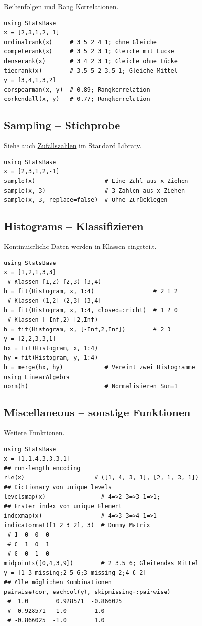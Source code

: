 \documentclass[10pt,twocolumn]{scrartcl}
\begin{document}
Reihenfolgen und Rang Korrelationen.

\begin{lstlisting}
using StatsBase
x = [2,3,1,2,-1]
ordinalrank(x)     # 3 5 2 4 1; ohne Gleiche
competerank(x)     # 3 5 2 3 1; Gleiche mit Lücke
denserank(x)       # 3 4 2 3 1; Gleiche ohne Lücke
tiedrank(x)        # 3.5 5 2 3.5 1; Gleiche Mittel
y = [3,4,1,3,2]
corspearman(x, y)  # 0.89; Rangkorrelation
corkendall(x, y)   # 0.77; Rangkorrelation
\end{lstlisting}

\subsection{Sampling -- Stichprobe}
\label{ssec:StatsBase_Sampling}

Siehe auch \hyperref[ssec:standardLibrary_Random]{Zufallszahlen} im Standard
Library.

\begin{lstlisting}
using StatsBase
x = [2,3,1,2,-1]
sample(x)                    # Eine Zahl aus x Ziehen
sample(x, 3)                 # 3 Zahlen aus x Ziehen
sample(x, 3, replace=false)  # Ohne Zurücklegen
\end{lstlisting}

\subsection{Histograms -- Klassifizieren}

Kontinuierliche Daten werden in Klassen eingeteilt.

\begin{lstlisting}
using StatsBase
x = [1,2,1,3,3]
 # Klassen [1,2) [2,3) [3,4)
h = fit(Histogram, x, 1:4)                 # 2 1 2
 # Klassen (1,2] (2,3] (3,4]
h = fit(Histogram, x, 1:4, closed=:right)  # 1 2 0
 # Klassen [-Inf,2) [2,Inf)
h = fit(Histogram, x, [-Inf,2,Inf])        # 2 3
y = [2,2,3,3,1]
hx = fit(Histogram, x, 1:4)
hy = fit(Histogram, y, 1:4)
h = merge(hx, hy)            # Vereint zwei Histogramme
using LinearAlgebra
norm(h)                      # Normalisieren Sum=1
\end{lstlisting}

\subsection{Miscellaneous -- sonstige Funktionen}

Weitere Funktionen.

\begin{lstlisting}
using StatsBase
x = [1,1,4,3,3,3,1]
## run-length encoding
rle(x)                    # ([1, 4, 3, 1], [2, 1, 3, 1])
## Dictionary von unique levels
levelsmap(x)                # 4=>2 3=>3 1=>1;
## Erster index von unique Element
indexmap(x)                 # 4=>3 3=>4 1=>1
indicatormat([1 2 3 2], 3)  # Dummy Matrix
 # 1  0  0  0
 # 0  1  0  1
 # 0  0  1  0
midpoints([0,4,3,9])        # 2 3.5 6; Gleitendes Mittel
y = [1 3 missing;2 5 6;3 missing 2;4 6 2]
## Alle möglichen Kombinationen
pairwise(cor, eachcol(y), skipmissing=:pairwise)
 #  1.0        0.928571  -0.866025
 #  0.928571   1.0       -1.0
 # -0.866025  -1.0        1.0
\end{lstlisting}
\end{document}
